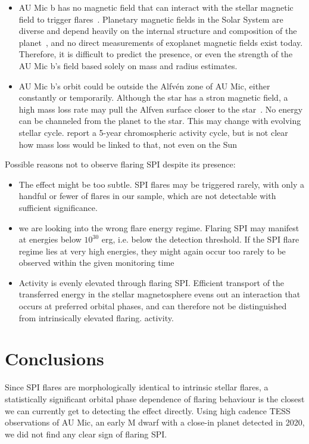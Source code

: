 \documentclass[fleqn,usenatbib,letters]{mnras}%
\begin{document}
\begin{itemize}
\item AU Mic b has no magnetic field that can interact with the stellar magnetic field to trigger flares~\citep{lanza2018close-by}. Planetary magnetic fields in the Solar System are diverse and depend heavily on the internal structure and composition of the planet~\citep{stevenson2003planetary}, and no direct measurements of exoplanet magnetic fields exist today. Therefore, it is difficult to predict the presence, or even the strength of the AU Mic b's field based solely on mass and radius estimates.
\item AU Mic b's orbit could be outside the Alfv\'en zone of AU Mic, either constantly or temporarily. Although the star has a stron magnetic field, a high mass loss rate may pull the Alfven surface closer to the star~\citep{kavanagh2021}. No energy can be channeled from the planet to the star. This may change with evolving stellar cycle. \citet{ibanez-bustos2019first} report a 5-year chromospheric activity cycle, but is not clear how mass loss would be linked to that, not even on the Sun
\end{itemize}


Possible reasons not to observe flaring SPI despite its presence:

\begin{itemize}
\item The effect might be too subtle. SPI flares may be triggered rarely, with only a handful or fewer of flares in our sample, which are not detectable with sufficient significance. 
\item we are looking into the wrong flare energy regime. Flaring SPI may manifest at energies below $10^30$ erg, i.e. below the detection threshold. If the SPI flare regime lies at very high energies, they might again occur too rarely to be observed within the given monitoring time
\item Activity is evenly elevated through flaring SPI. Efficient transport of the transferred energy in the stellar magnetosphere evens out an interaction that occurs at preferred orbital phases, and can therefore not be distinguished from intrinsically elevated flaring. activity.
\end{itemize}

\section{Conclusions}
\label{sec:conclusions}
Since SPI flares are morphologically identical to intrinsic stellar flares, a statistically significant orbital phase dependence of flaring behaviour is the closest we can currently get to detecting the effect directly. Using high cadence TESS observations of AU Mic, an early M dwarf with a close-in planet detected in 2020, we did not find any clear sign of flaring SPI.
\end{document}
